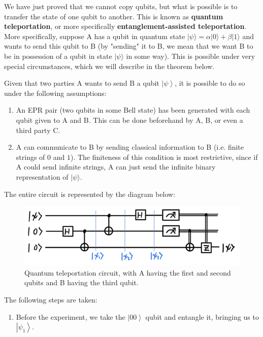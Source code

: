 \documentclass{article}
\newcommand{\ket}[1]{\ensuremath{\left|#1\right\rangle}}
\begin{document}
    We have just proved that we cannot copy qubits, but what is possible is to transfer the state of one qubit to another. This is known as \textbf{quantum teleportation}, or more specifically \textbf{entanglement-assisted teleportation}. More specifically, suppose A has a qubit in quantum state $|\psi \rangle = \alpha |0\rangle + \beta |1 \rangle$ and wants to send this qubit to B (by "sending" it to B, we mean that we want B to be in possession of a qubit in state $|\psi \rangle$ in some way). This is possible under very special circumstances, which we will describe in the theorem below.  

    \begin{theorem}
      Given that two parties A wants to send B a qubit $\ket{\psi}$, it is possible to do so under the following assumptions: 
      \begin{enumerate}
        \item An EPR pair (two qubits in some Bell state) has been generated with each qubit given to A and B. This can be done beforehand by A, B, or even a third party C. 
        \item A can communicate to B by sending classical information to B (i.e. finite strings of $0$ and $1$). The finiteness of this condition is most restrictive, since if A could send infinite strings, A can just send the infinite binary representation of $|\psi\rangle$.
      \end{enumerate}
      The entire circuit is represented by the diagram below: 
      \begin{figure}[H]
        \centering 
        \includegraphics[scale=0.4]{img/quantum_teleportation.png}
        \caption{Quantum teleportation circuit, with A having the first and second qubits and B having the third qubit. } 
        \label{fig:quantum_teleportation}
      \end{figure}
      The following steps are taken: 
      \begin{enumerate} 
        \item Before the experiment, we take the $\ket{00}$ qubit and entangle it, bringing us to $\ket{\psi_1}$. 
          \begin{align} 

\end{align}
\end{enumerate}
\end{theorem}
\end{document}
